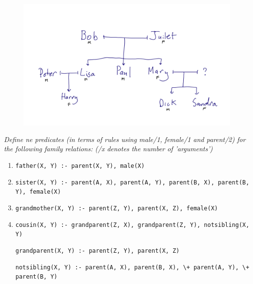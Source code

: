 \documentclass{report}
\newcommand{\code}[1]{\texttt{#1}}
\begin{document}
\begin{figure}[h]
    \centering
    \includegraphics[width=1\textwidth]{Family_Tree.png}
    \label{fig:Family_Tree}
\end{figure}

\noindent\emph{Define ne predicates (in terms of rules using male/1, female/1 and parent/2) for the following family relations: (/x denotes the number of 'arguments')}

\begin{enumerate}[label=(\alph*)]
    \item \code{father(X, Y) :- parent(X, Y), male(X)}
    \item \code{sister(X, Y) :- parent(A, X), parent(A, Y), parent(B, X), parent(B, Y), female(X)}
    \item \code{grandmother(X, Y) :- parent(Z, Y), parent(X, Z), female(X)}
    \item \code{cousin(X, Y) :- grandparent(Z, X), grandparent(Z, Y), notsibling(X, Y)}
    
    \code{grandparent(X, Y) :- parent(Z, Y), parent(X, Z)}

    \code{notsibling(X, Y) :- parent(A, X), parent(B, X), \textbackslash+ parent(A, Y), \textbackslash+ parent(B, Y)}
    

\end{enumerate}
\end{document}
